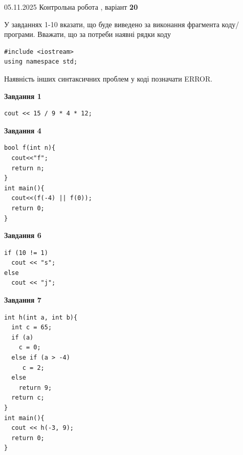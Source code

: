 \documentclass[12pt, ukrainian]{article}
\begin{document}
{\Large{05.11.2025 Контрольна робота , варіант  \No \textbf { 20 }\par}}
{
\begin {large}
У завданнях 1-10 вказати, що буде виведено за виконання фрагмента коду/про\-гра\-ми.
Вважати, що за потреби наявні рядки коду
\begin{verbatim}
#include <iostream>
using namespace std;
\end{verbatim}
Наявність інших синтаксичних проблем у коді позначати ERROR.

\begin{minipage}[t]{7.0cm}

\begin{center}
\textbf{Завдання 1}
\end{center}
\vspace{-8mm}

\begin{verbatim}
cout << 15 / 9 * 4 * 12;
\end{verbatim}



\begin{center}
\textbf{Завдання 4}
\end{center}
\vspace{-8mm}

\begin{verbatim}
bool f(int n){
  cout<<"f";
  return n;
}
int main(){
  cout<<(f(-4) || f(0));
  return 0;
}
\end{verbatim}



\begin{center}
\textbf{Завдання 6}
\end{center}
\vspace{-8mm}

\begin{verbatim}
if (10 != 1)
  cout << "s";
else
  cout << "j";
\end{verbatim}



\begin{center}
\textbf{Завдання 7}
\end{center}
\vspace{-8mm}

\begin{verbatim}
int h(int a, int b){
  int c = 65;
  if (a)
    c = 0;
  else if (a > -4)
     c = 2;
  else
    return 9;
  return c;
}
int main(){
  cout << h(-3, 9);
  return 0;
}
\end{verbatim}


\end{minipage}
\end{large}}
\end{document}
